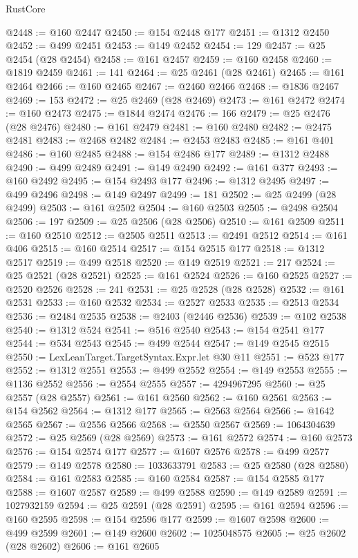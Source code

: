 \begin{lexlean}{RustCore}
\begin{coremodule}
@2448 := @160 @2447
@2450 := @154 @2448 @177
@2451 := @1312 @2450
@2452 := @499 @2451
@2453 := @149 @2452
@2454 := 129
@2457 := @25 @2454 (@28 @2454)
@2458 := @161 @2457
@2459 := @160 @2458
@2460 := @1819 @2459
@2461 := 141
@2464 := @25 @2461 (@28 @2461)
@2465 := @161 @2464
@2466 := @160 @2465
@2467 := @2460 @2466
@2468 := @1836 @2467
@2469 := 153
@2472 := @25 @2469 (@28 @2469)
@2473 := @161 @2472
@2474 := @160 @2473
@2475 := @1844 @2474
@2476 := 166
@2479 := @25 @2476 (@28 @2476)
@2480 := @161 @2479
@2481 := @160 @2480
@2482 := @2475 @2481
@2483 := @2468 @2482
@2484 := @2453 @2483
@2485 := @161 @401
@2486 := @160 @2485
@2488 := @154 @2486 @177
@2489 := @1312 @2488
@2490 := @499 @2489
@2491 := @149 @2490
@2492 := @161 @377
@2493 := @160 @2492
@2495 := @154 @2493 @177
@2496 := @1312 @2495
@2497 := @499 @2496
@2498 := @149 @2497
@2499 := 181
@2502 := @25 @2499 (@28 @2499)
@2503 := @161 @2502
@2504 := @160 @2503
@2505 := @2498 @2504
@2506 := 197
@2509 := @25 @2506 (@28 @2506)
@2510 := @161 @2509
@2511 := @160 @2510
@2512 := @2505 @2511
@2513 := @2491 @2512
@2514 := @161 @406
@2515 := @160 @2514
@2517 := @154 @2515 @177
@2518 := @1312 @2517
@2519 := @499 @2518
@2520 := @149 @2519
@2521 := 217
@2524 := @25 @2521 (@28 @2521)
@2525 := @161 @2524
@2526 := @160 @2525
@2527 := @2520 @2526
@2528 := 241
@2531 := @25 @2528 (@28 @2528)
@2532 := @161 @2531
@2533 := @160 @2532
@2534 := @2527 @2533
@2535 := @2513 @2534
@2536 := @2484 @2535
@2538 := @2403 (@2446 @2536)
@2539 := @102 @2538
@2540 := @1312 @524
@2541 := @516 @2540
@2543 := @154 @2541 @177
@2544 := @534 @2543
@2545 := @499 @2544
@2547 := @149 @2545 @2515
@2550 := LexLeanTarget.TargetSyntax.Expr.let @30 @11
@2551 := @523 @177
@2552 := @1312 @2551
@2553 := @499 @2552
@2554 := @149 @2553
@2555 := @1136 @2552
@2556 := @2554 @2555
@2557 := 4294967295
@2560 := @25 @2557 (@28 @2557)
@2561 := @161 @2560
@2562 := @160 @2561
@2563 := @154 @2562
@2564 := @1312 @177
@2565 := @2563 @2564
@2566 := @1642 @2565
@2567 := @2556 @2566
@2568 := @2550 @2567
@2569 := 1064304639
@2572 := @25 @2569 (@28 @2569)
@2573 := @161 @2572
@2574 := @160 @2573
@2576 := @154 @2574 @177
@2577 := @1607 @2576
@2578 := @499 @2577
@2579 := @149 @2578
@2580 := 1033633791
@2583 := @25 @2580 (@28 @2580)
@2584 := @161 @2583
@2585 := @160 @2584
@2587 := @154 @2585 @177
@2588 := @1607 @2587
@2589 := @499 @2588
@2590 := @149 @2589
@2591 := 1027932159
@2594 := @25 @2591 (@28 @2591)
@2595 := @161 @2594
@2596 := @160 @2595
@2598 := @154 @2596 @177
@2599 := @1607 @2598
@2600 := @499 @2599
@2601 := @149 @2600
@2602 := 1025048575
@2605 := @25 @2602 (@28 @2602)
@2606 := @161 @2605

\end{coremodule}
\end{lexlean}
